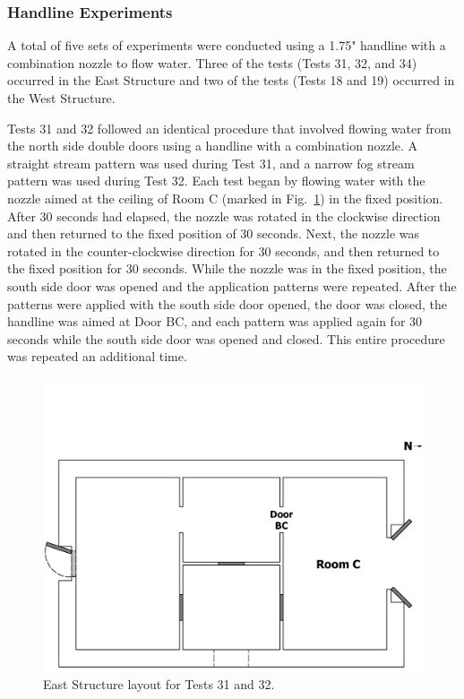 \documentclass[12pt,oneside]{book}
\begin{document}
\subsubsection{Handline Experiments}
\label{sec:Water_Flow_Handline_Procedure}
A total of five sets of experiments were conducted using a 1.75" handline with a combination nozzle to flow water. Three of the tests (Tests 31, 32, and 34) occurred in the East Structure and two of the tests (Tests 18 and 19) occurred in the West Structure. 

Tests 31 and 32 followed an identical procedure that involved flowing water from the north side double doors using a handline with a combination nozzle. A straight stream pattern was used during Test 31, and a narrow fog stream pattern was used during Test 32. Each test began by flowing water with the nozzle aimed at the ceiling of Room C (marked in Fig.~\ref{fig:Test_31_32_setup}) in the fixed position. After 30 seconds had elapsed, the nozzle was rotated in the clockwise direction and then returned to the fixed position of 30 seconds. Next, the nozzle was rotated in the counter-clockwise direction for 30 seconds, and then returned to the fixed position for 30 seconds. While the nozzle was in the fixed position, the south side door was opened and the application patterns were repeated. After the patterns were applied with the south side door opened, the door was closed, the handline was aimed at Door BC, and each pattern was applied again for 30 seconds while the south side door was opened and closed. This entire procedure was repeated an additional time.

\begin{figure}[!ht]
\includegraphics[trim=0cm 0cm 0cm 4.5cm, clip=true, width=6in]{../Drawings/Specific_Tests/East_Structure_Hose_Test_31_32}
\caption[East Structure layout for Tests 31 and 32]{East Structure layout for Tests 31 and 32.}
\label{fig:Test_31_32_setup}
\end{figure}
\FloatBarrier
\end{document}
